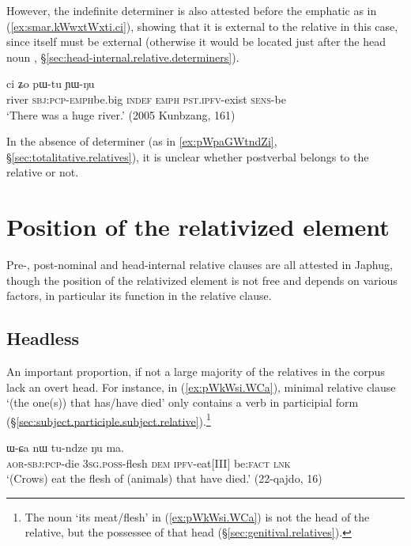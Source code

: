 However, the indefinite determiner  is also attested before the emphatic  as in (\ref{ex:smar.kWwxtWxti.ci}), showing that it is external to the relative in this case, since  itself must be external (otherwise it would be located just after the head noun , §\ref{sec:head-internal.relative.determiners}).

\begin{exe}
\ex \label{ex:smar.kWwxtWxti.ci}
 ci ʑo pɯ-tu ɲɯ-ŋu \\
river \textsc{sbj}:\textsc{pcp}-\textsc{emph}\redp{}be.big \textsc{indef} \textsc{emph} \textsc{pst}.\textsc{ipfv}-exist \textsc{sens}-be \\
\glt `There was a huge river.' (2005 Kunbzang, 161)
\end{exe} 

In the absence of determiner (as in \ref{ex:pWpaGWtndZi}, §\ref{sec:totalitative.relatives}), it is unclear whether postverbal  belongs to the relative or not.

\section{Position of the relativized element} \label{sec:position.head.relative}
Pre-, post-nominal and head-internal relative clauses are all attested in Japhug, though the position of the relativized element is not free and depends on various factors, in particular its function in the relative clause.

\subsection{Headless} \label{sec:headless.relative}
An important proportion, if not a large majority of the relatives in the corpus lack an overt head. For instance, in (\ref{ex:pWkWsi.WCa}), minimal relative clause  `(the one(s)) that has/have died' only contains a verb in participial form (§\ref{sec:subject.participle.subject.relative}).\footnote{The noun  `its meat/flesh' in (\ref{ex:pWkWsi.WCa}) is not the head of the relative, but the possessee of that head (§\ref{sec:genitival.relatives}). }

\begin{exe}
\ex \label{ex:pWkWsi.WCa}
\gll [pɯ-kɯ-si] ɯ-ɕa nɯ tu-ndze ŋu ma. \\
\textsc{aor}-\textsc{sbj}:\textsc{pcp}-die \textsc{3sg}.\textsc{poss}-flesh \textsc{dem} \textsc{ipfv}-eat[III] be:\textsc{fact} \textsc{lnk} \\
\glt `(Crows) eat the flesh of (animals) that have died.' (22-qajdo, 16)
\end{exe} 

